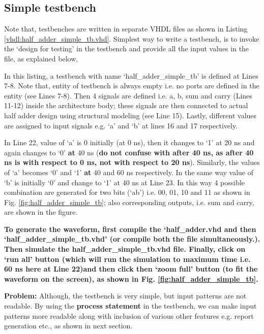 


\subsection{Simple testbench}

Note that, testbenches are written in separate VHDL files as shown in Listing \ref{vhdl:half_adder_simple_tb.vhd}. Simplest way to write a testbench, is to invoke the `design for testing' in the testbench and provide all the input values in the file,  as explained below, 

\begin{explanation}
	In this listing, a testbench with name `half\_adder\_simple\_tb' is defined at Lines 7-8. Note that, entity of testbench is always empty i.e. no ports are defined in the entity (see Lines 7-8). Then 4 signals are defined i.e. a, b, sum and carry (Lines 11-12) inside the architecture body; these signals are then connected to actual half adder design using structural modeling (see Line 15). Lastly, different values are assigned to input signals e.g. `a' and `b' at lines 16 and 17 respectively. 
	
	In Line 22, value of `a' is 0 initially (at 0 ns), then it changes to `1' at 20 ns and again changes to `0' \textbf{at} 40 ns (\textbf{do not confuse with after 40 ns, as after 40 ns is with respect to 0 ns, not with respect to 20 ns}). Similarly, the values of `a' becomes `0' and `1' \textbf{at} 40 and 60 ns respectively. In the same way value of `b' is initially `0' and change to `1' at 40 ns at Line 23. In this way 4 possible combination are generated for two bits (`ab') i.e. 00, 01, 10 and 11 as shown in Fig. \ref{fig:half_adder_simple_tb}; also corresponding outputs, i.e. sum and carry, are shown in the figure. 
	
	\textbf{To generate the waveform, first compile the `half\_adder.vhd and then `half\_adder\_simple\_tb.vhd' (or compile both the file simultaneously.). Then simulate the half\_adder\_simple\_tb.vhd file. Finally, click on `run all' button (which will run the simulation to maximum time i.e. 60 ns here at Line 22)and then click then `zoom full' button (to fit the waveform on the screen), as shown in Fig. \ref{fig:half_adder_simple_tb}.}
\end{explanation}

\textbf{Problem: } Although, the testbench is very simple, but input patterns are not readable. By using the \textbf{process statement} in the testbench, we can make input patterns more readable along with inclusion  of various other features e.g. report generation etc., as shown in next section. 

